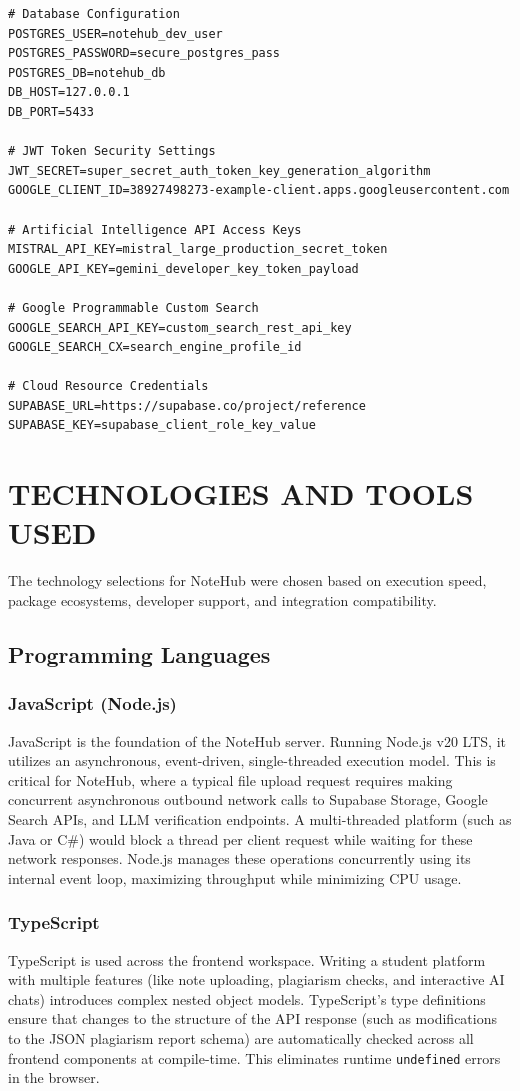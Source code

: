 \documentclass[12,Times new Roman,a4paper]{report}
\begin{document}
\begin{verbatim}
# Database Configuration
POSTGRES_USER=notehub_dev_user
POSTGRES_PASSWORD=secure_postgres_pass
POSTGRES_DB=notehub_db
DB_HOST=127.0.0.1
DB_PORT=5433

# JWT Token Security Settings
JWT_SECRET=super_secret_auth_token_key_generation_algorithm
GOOGLE_CLIENT_ID=38927498273-example-client.apps.googleusercontent.com

# Artificial Intelligence API Access Keys
MISTRAL_API_KEY=mistral_large_production_secret_token
GOOGLE_API_KEY=gemini_developer_key_token_payload

# Google Programmable Custom Search
GOOGLE_SEARCH_API_KEY=custom_search_rest_api_key
GOOGLE_SEARCH_CX=search_engine_profile_id

# Cloud Resource Credentials
SUPABASE_URL=https://supabase.co/project/reference
SUPABASE_KEY=supabase_client_role_key_value
\end{verbatim}

\newpage
\section{TECHNOLOGIES AND TOOLS USED}

The technology selections for NoteHub were chosen based on execution speed, package ecosystems, developer support, and integration compatibility.

\subsection{Programming Languages}

\subsubsection*{JavaScript (Node.js)}
JavaScript is the foundation of the NoteHub server. Running Node.js v20 LTS, it utilizes an asynchronous, event-driven, single-threaded execution model. This is critical for NoteHub, where a typical file upload request requires making concurrent asynchronous outbound network calls to Supabase Storage, Google Search APIs, and LLM verification endpoints. A multi-threaded platform (such as Java or C\#) would block a thread per client request while waiting for these network responses. Node.js manages these operations concurrently using its internal event loop, maximizing throughput while minimizing CPU usage.

\subsubsection*{TypeScript}
TypeScript is used across the frontend workspace. Writing a student platform with multiple features (like note uploading, plagiarism checks, and interactive AI chats) introduces complex nested object models. TypeScript's type definitions ensure that changes to the structure of the API response (such as modifications to the JSON plagiarism report schema) are automatically checked across all frontend components at compile-time. This eliminates runtime \texttt{undefined} errors in the browser.
\end{document}
